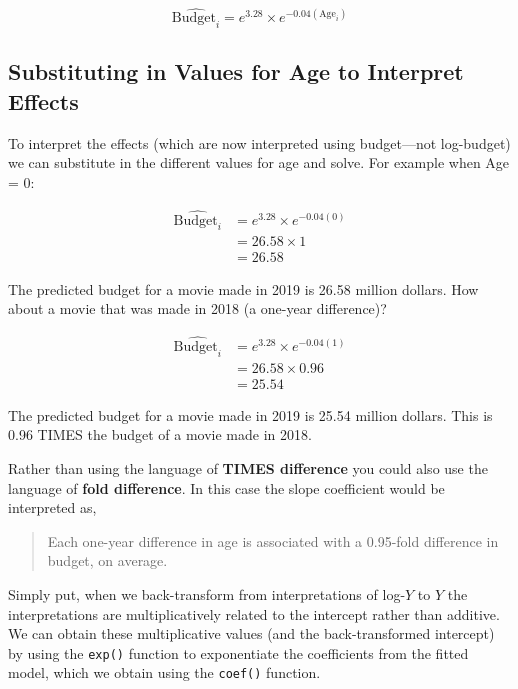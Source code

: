 \documentclass[]{book}
\begin{document}
\[
\hat{\mathrm{Budget}_i} = e^{3.28} \times e^{-0.04(\mathrm{Age}_i)}
\]

\hypertarget{substituting-in-values-for-age-to-interpret-effects}{%
\subsection{Substituting in Values for Age to Interpret Effects}\label{substituting-in-values-for-age-to-interpret-effects}}

To interpret the effects (which are now interpreted using budget---not log-budget) we can substitute in the different values for age and solve. For example when Age = 0:

\[
\begin{split}
\hat{\mathrm{Budget}_i} &= e^{3.28} \times e^{-0.04(0)}\\
&= 26.58 \times 1 \\
&= 26.58
\end{split}
\]

The predicted budget for a movie made in 2019 is 26.58 million dollars. How about a movie that was made in 2018 (a one-year difference)?

\[
\begin{split}
\hat{\mathrm{Budget}_i} &= e^{3.28} \times e^{-0.04(1)}\\
&= 26.58 \times 0.96 \\
&= 25.54
\end{split}
\]

The predicted budget for a movie made in 2019 is 25.54 million dollars. This is 0.96 TIMES the budget of a movie made in 2018.

Rather than using the language of \textbf{TIMES difference} you could also use the language of \textbf{fold difference}. In this case the slope coefficient would be interpreted as,

\begin{quote}
Each one-year difference in age is associated with a 0.95-fold difference in budget, on average.
\end{quote}

Simply put, when we back-transform from interpretations of log-\(Y\) to \(Y\) the interpretations are multiplicatively related to the intercept rather than additive. We can obtain these multiplicative values (and the back-transformed intercept) by using the \texttt{exp()} function to exponentiate the coefficients from the fitted model, which we obtain using the \texttt{coef()} function.
\end{document}
